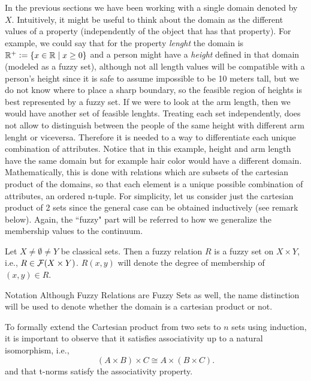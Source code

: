   In the previous sections we have been working with a single domain denoted by $X$. Intuitively, it might be useful to think about the domain as the different values of a property (independently of the object that has that property). For example, we could say that for the property \textit{lenght} the domain is $\mathbb{R}^+\mathrel{\mathop:}=
  \{x\in\mathbb{R} \mid x \geq 0\}$ and a person might have a \textit{height} defined in that domain (modeled as a fuzzy set), although not all length values will be compatible with a person's height since it is safe to assume impossible to be 10 meters tall, but we do not know where to place a sharp boundary, so the feasible region of heights is best represented by a fuzzy set. If we were to look at the arm length, then we would have another set of feasible lenghts. Treating each set independently, does not allow to distinguish between the people of the same height with different arm lenght or viceversa. Therefore it is needed to a way to differentiate each unique combination of attributes. Notice that in this example, height and arm length have the same domain but for example hair color would have a different domain.\\

  Mathematically, this is done with relations which are subsets of the cartesian product of the domains, so that each element is a unique possible combination of attributes, an ordered n-tuple. For simplicity, let us consider just the cartesian product of 2 sets since the general case can be obtained inductively (see remark below). Again, the ``fuzzy" part will be referred to how we generalize the membership values to the continuum.


  \begin{definition}
    Let $X\neq \emptyset \neq Y$ be classical sets. Then a fuzzy relation $R$ is a fuzzy set on $X\times Y$, i.e., $R\in \mathcal{F}(X\times Y)$. $R(x,y)$ will denote the degree of membership of $(x,y) \in R$.
  \end{definition}

  \begin{notation}[label={not:compositionFS}]{Notation}
    Although Fuzzy Relations are Fuzzy Sets as well, the name distinction will be used to denote whether the domain is a cartesian product or not.
  \end{notation}

  \begin{remark}
    To formally extend the Cartesian product from two sets to \( n \) sets using induction, it is important to observe that it satisfies associativity up to a natural isomorphism, i.e., 
    \[
    (A\times B)\times C \cong A\times (B\times C).
    \]
    and that t-norms satisfy the associativity property.
  \end{remark}

